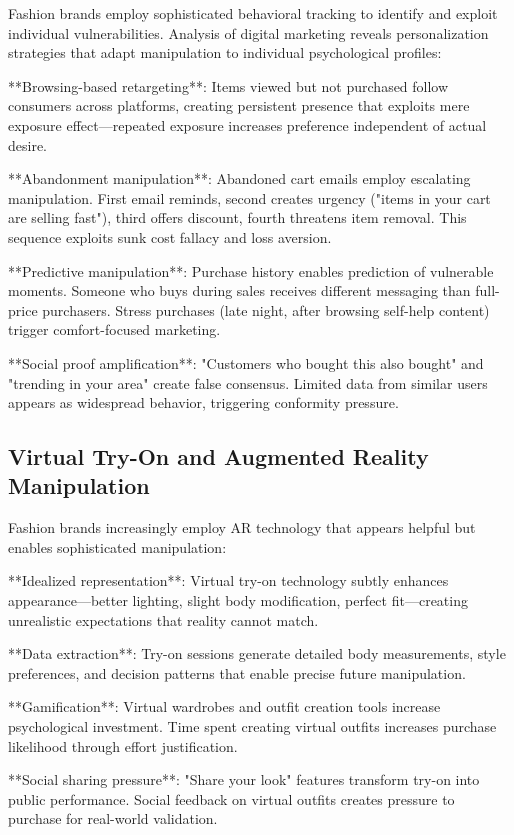 Fashion brands employ sophisticated behavioral tracking to identify and exploit individual vulnerabilities. Analysis of digital marketing reveals personalization strategies that adapt manipulation to individual psychological profiles:

**Browsing-based retargeting**: Items viewed but not purchased follow consumers across platforms, creating persistent presence that exploits mere exposure effect—repeated exposure increases preference independent of actual desire.

**Abandonment manipulation**: Abandoned cart emails employ escalating manipulation. First email reminds, second creates urgency ("items in your cart are selling fast"), third offers discount, fourth threatens item removal. This sequence exploits sunk cost fallacy and loss aversion.

**Predictive manipulation**: Purchase history enables prediction of vulnerable moments. Someone who buys during sales receives different messaging than full-price purchasers. Stress purchases (late night, after browsing self-help content) trigger comfort-focused marketing.

**Social proof amplification**: "Customers who bought this also bought" and "trending in your area" create false consensus. Limited data from similar users appears as widespread behavior, triggering conformity pressure.

\subsection{Virtual Try-On and Augmented Reality Manipulation}

Fashion brands increasingly employ AR technology that appears helpful but enables sophisticated manipulation:

**Idealized representation**: Virtual try-on technology subtly enhances appearance—better lighting, slight body modification, perfect fit—creating unrealistic expectations that reality cannot match.

**Data extraction**: Try-on sessions generate detailed body measurements, style preferences, and decision patterns that enable precise future manipulation.

**Gamification**: Virtual wardrobes and outfit creation tools increase psychological investment. Time spent creating virtual outfits increases purchase likelihood through effort justification.

**Social sharing pressure**: "Share your look" features transform try-on into public performance. Social feedback on virtual outfits creates pressure to purchase for real-world validation.

